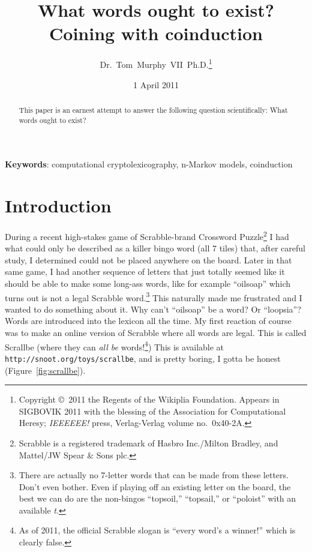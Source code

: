 \documentclass[twocolumn]{article}
\begin{document}
 

\title{What words ought to exist? \\
       {\normalsize Coining with coinduction}}
\author{Dr.~Tom~Murphy~VII~Ph.D.\thanks{
Copyright \copyright\ 2011 the Regents of the Wikiplia
Foundation. Appears in SIGBOVIK 2011 with the blessing of the
Association for Computational Heresy; {\em IEEEEEE!} press,
Verlag-Verlag volume no.~0x40-2A.
}
}


\renewcommand\>{$>$}
\newcommand\<{$<$}

\date{1 April 2011}

\maketitle

\begin{abstract}
This paper is an earnest attempt to answer the following question
scientifically: What words ought to exist?
\end{abstract}

\vspace{1em}
{\noindent \small {\bf Keywords}:
 computational cryptolexicography, n-Markov models, coinduction
}

\section*{Introduction}
During a recent high-stakes game of Scrabble-brand Crossword
Puzzle\footnote{Scrabble is a registered trademark of Hasbro
  Inc./Milton Bradley, and Mattel/JW Spear \& Sons plc.} I had what
could only be described as a killer bingo word (all 7 tiles) that,
after careful study, I determined could not be placed anywhere on the
board. Later in that same game, I had another sequence of letters that
just totally seemed like it should be able to make some long-ass
words, like for example ``oilsoap'' which turns out is not a legal
Scrabble word.\!\footnote{There are actually no 7-letter words that
  can be made from these letters. Don't even bother. Even if playing
  off an existing letter on the board, the best we can do are the
  non-bingos ``topsoil,'' ``topsail,'' or ``poloist'' with an
  available {\it t}.} This naturally made me frustrated and I wanted
to do something about it. Why can't ``oilsoap'' be a word? Or
``loopsia''? Words are introduced into the lexicon all the time. My
first reaction of course was to make an online version of Scrabble
where all words are legal. This is called Scrallbe (where they can
{\it all be} words!\footnote{As of 2011, the official Scrabble slogan
  is ``every word's a winner!'' which is clearly false.}) This is
available at {\tt http://snoot.org/toys/scrallbe}, and is pretty
boring, I gotta be honest (Figure~\ref{fig:scrallbe}).
\end{document}

